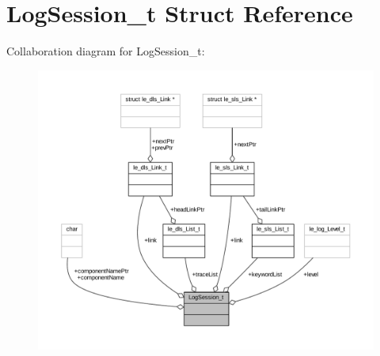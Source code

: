 \hypertarget{struct_log_session__t}{}\section{Log\+Session\+\_\+t Struct Reference}
\label{struct_log_session__t}


Collaboration diagram for Log\+Session\+\_\+t\+:
\nopagebreak
\begin{figure}[H]
\begin{center}
\leavevmode
\includegraphics[width=350pt]{struct_log_session__t__coll__graph}
\end{center}
\end{figure}
